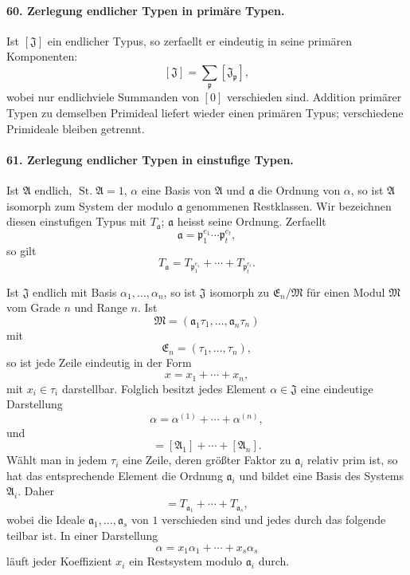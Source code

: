 \documentclass[11pt]{article}
\newcommand{\St}{\operatorname{St.}}
\begin{document}
\paragraph{60. Zerlegung endlicher Typen in primäre Typen.}
Ist $[\mathfrak J]$ ein endlicher Typus, so zerfaellt er eindeutig in seine primären Komponenten:
\[
  [\mathfrak J]=\sum_{\mathfrak p}[\mathfrak J_{\mathfrak p}],
\]
wobei nur endlichviele Summanden von $[0]$ verschieden sind. Addition primärer Typen zu demselben Primideal liefert wieder einen primären Typus; verschiedene Primideale bleiben getrennt.

\paragraph{61. Zerlegung endlicher Typen in einstufige Typen.}
Ist $\mathfrak A$ endlich, $\St\mathfrak A=1$, $\alpha$ eine Basis von $\mathfrak A$ und $\mathfrak a$ die Ordnung von $\alpha$, so ist $\mathfrak A$ isomorph zum System der modulo $\mathfrak a$ genommenen Restklassen. Wir bezeichnen diesen einstufigen Typus mit $T_{\mathfrak a}$; $\mathfrak a$ heisst seine Ordnung. Zerfaellt
\[
  \mathfrak a=\mathfrak p_1^{e_1}\cdots\mathfrak p_t^{e_t},
\]
so gilt
\[
  T_{\mathfrak a}=T_{\mathfrak p_1^{e_1}}+\cdots+T_{\mathfrak p_t^{e_t}}.
\]

Ist $\mathfrak J$ endlich mit Basis $\alpha_1,
\ldots,
\alpha_n$, so ist $\mathfrak J$ isomorph zu $\mathfrak E_n/\mathfrak M$ für einen Modul $\mathfrak M$ vom Grade $n$ und Range $n$. Ist
\begin{equation}
  \mathfrak M=(\mathfrak a_1\tau_1,
  \ldots,
  \mathfrak a_n\tau_n)
\tag{106}
\end{equation}
mit
\begin{equation}
  \mathfrak E_n=(\tau_1,
  \ldots,
  \tau_n),
\tag{107}
\end{equation}
so ist jede Zeile eindeutig in der Form
\begin{equation}
  x=x_1+\cdots+x_n,
\tag{108}
\end{equation}
mit $x_i\in\tau_i$ darstellbar. Folglich besitzt jedes Element $\alpha\in\mathfrak J$ eine eindeutige Darstellung
\begin{equation}
  \alpha=\alpha^{(1)}+\cdots+\alpha^{(n)},
\tag{109}
\end{equation}
und
\begin{equation}
  [\mathfrak J]=[\mathfrak A_1]+\cdots+[\mathfrak A_n].
\tag{110}
\end{equation}
Wählt man in jedem $\tau_i$ eine Zeile, deren größter Faktor zu $\mathfrak a_i$ relativ prim ist, so hat das entsprechende Element die Ordnung $\mathfrak a_i$ und bildet eine Basis des Systems $\mathfrak A_i$. Daher
\begin{equation}
  [\mathfrak J]=T_{\mathfrak a_1}+\cdots+T_{\mathfrak a_s},
\tag{111}
\end{equation}
wobei die Ideale $\mathfrak a_1,
\ldots,
\mathfrak a_s$ von $1$ verschieden sind und jedes durch das folgende teilbar ist. In einer Darstellung
\begin{equation}
  \alpha=x_1\alpha_1+\cdots+x_s\alpha_s
\tag{112}
\end{equation}
läuft jeder Koeffizient $x_i$ ein Restsystem modulo $\mathfrak a_i$ durch.
\end{document}
